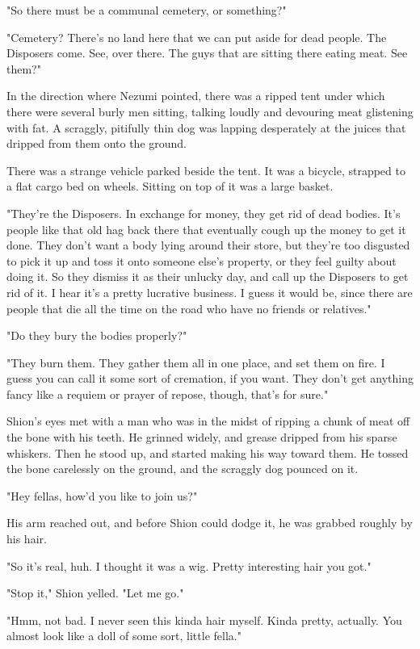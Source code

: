 "So there must be a communal cemetery, or something?"

"Cemetery? There's no land here that we can put aside for dead people.
The Disposers come. See, over there. The guys that are sitting there
eating meat. See them?"

In the direction where Nezumi pointed, there was a ripped tent under
which there were several burly men sitting, talking loudly and devouring
meat glistening with fat. A scraggly, pitifully thin dog was lapping
desperately at the juices that dripped from them onto the ground.

There was a strange vehicle parked beside the tent. It was a bicycle,
strapped to a flat cargo bed on wheels. Sitting on top of it was a large
basket.

"They're the Disposers. In exchange for money, they get rid of dead
bodies. It's people like that old hag back there that eventually cough
up the money to get it done. They don't want a body lying around their
store, but they're too disgusted to pick it up and toss it onto someone
else's property, or they feel guilty about doing it. So they dismiss it
as their unlucky day, and call up the Disposers to get rid of it. I hear
it's a pretty lucrative business. I guess it would be, since there are
people that die all the time on the road who have no friends or
relatives."

"Do they bury the bodies properly?"

"They burn them. They gather them all in one place, and set them on
fire. I guess you can call it some sort of cremation, if you want. They
don't get anything fancy like a requiem or prayer of repose, though,
that's for sure."

Shion's eyes met with a man who was in the midst of ripping a chunk of
meat off the bone with his teeth. He grinned widely, and grease dripped
from his sparse whiskers. Then he stood up, and started making his way
toward them. He tossed the bone carelessly on the ground, and the
scraggly dog pounced on it.

"Hey fellas, how'd you like to join us?"

His arm reached out, and before Shion could dodge it, he was grabbed
roughly by his hair.

"So it's real, huh. I thought it was a wig. Pretty interesting hair you
got."

"Stop it," Shion yelled. "Let me go."

"Hmm, not bad. I never seen this kinda hair myself. Kinda pretty,
actually. You almost look like a doll of some sort, little fella."

